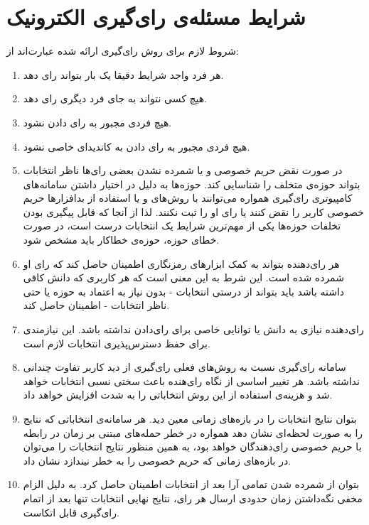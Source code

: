 \section{شرایط مسئله‌ی رای‌گیری الکترونیک}
شروط لازم برای روش‌ رای‌گیری ارائه شده عبارت‌اند از:  
\begin{enumerate}
	\item 
	هر فرد واجد شرایط دقیقا یک بار بتواند رای دهد.
	\item 
	هیچ کسی نتواند به جای فرد دیگری رای دهد.
	\item 
	هیچ فردی مجبور به رای دادن نشود.
	\item 
	هیچ فردی مجبور به رای دادن به کاندیدای خاصی نشود.
	\item 
	در صورت نقض حریم خصوصی و یا شمرده نشدن بعضی رای‌ها ناظر انتخابات بتواند حوزه‌ی متخلف را شناسایی کند. حوزه‌ها به دلیل در اختیار داشتن سامانه‌های کامپیوتری رای‌گیری همواره می‌توانند با روش‌های 
	و یا استفاده از بد‌افزار‌ها حریم خصوصی کاربر را نقض کنند یا رای او را ثبت نکنند. لذا از آنجا که قابل پیگیری بودن تخلفات حوزه‌ها یکی از مهم‌ترین شرایط یک انتخابات درست است، در صورت خطای حوزه، حوزه‌ی خطاکار باید مشخص شود.
	\item 
	هر رای‌دهنده بتواند به کمک ابزارهای رمزنگاری اطمینان حاصل کند که رای او شمرده شده است. این شرط به این معنی است که هر کاربری که دانش کافی داشته باشد باید بتواند از درستی انتخابات - بدون نیاز به اعتماد به حوزه یا حتی ناظر انتخابات - اطمینان حاصل کند. 
	\item
	رای‌دهنده نیازی به دانش یا توانایی خاصی برای رای‌دادن نداشته باشد. این نیازمندی برای حفظ دسترس‌پذیری انتخابات لازم است.
	\item
	سامانه رای‌گیری نسبت به روش‌های فعلی رای‌گیری از دید کاربر تفاوت چندانی نداشته باشد. هر تغییر اساسی از نگاه رای‌هنده باعث سختی نسبی انتخابات خواهد شد و هزینه‌ی  استفاده از این روش انتخاباتی را به شدت افزایش خواهد داد.
	\item 
	بتوان نتایج انتخابات را در بازه‌های زمانی معین دید. هر سامانه‌ی انتخاباتی که نتایج را به صورت لحظه‌ای نشان دهد همواره در خطر حمله‌های مبتنی بر زمان در رابطه با حریم خصوصی رای‌دهندگان خواهد بود، به همین منظور نتایج انتخابات را می‌توان در بازه‌های زمانی که حریم خصوصی را به خطر نیندازد نشان داد.
	\item 
	بتوان از شمرده شدن تمامی آرا بعد از انتخابات اطمینان حاصل کرد. به دلیل الزام مخفی نگه‌داشتن زمان حدودی ارسال هر رای، نتایج نهایی انتخابات تنها بعد از اتمام رای‌گیری قابل اتکاست.
\end{enumerate}

